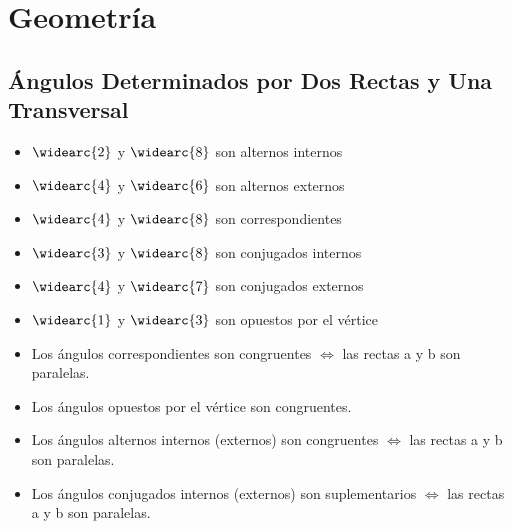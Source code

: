 \documentclass[10pt]{article}
\begin{document}
\newpage
\section{Geometría}
\subsection{Ángulos Determinados por Dos Rectas y Una Transversal}
\begin{multicols}{2}
\begin{itemize}
\item $\widearc{2}$ y $\widearc{8}$ son alternos internos
\item $\widearc{4}$ y $\widearc{6}$ son alternos externos
\item $\widearc{4}$ y $\widearc{8}$ son correspondientes
\item $\widearc{3}$ y $\widearc{8}$ son conjugados internos
\item $\widearc{4}$ y $\widearc{7}$ son conjugados externos
\item $\widearc{1}$ y $\widearc{3}$ son opuestos por el vértice
\end{itemize}
\end{multicols}
\begin{itemize}
\item Los ángulos correspondientes son congruentes $\iff$ las rectas a y b son paralelas.
\item Los ángulos opuestos por el vértice son congruentes.
\item Los ángulos alternos internos (externos) son congruentes $\iff$ las rectas a y b son paralelas.
\item Los ángulos conjugados internos (externos) son suplementarios $\iff$ las rectas a y b son paralelas.
\end{itemize}
\end{document}
